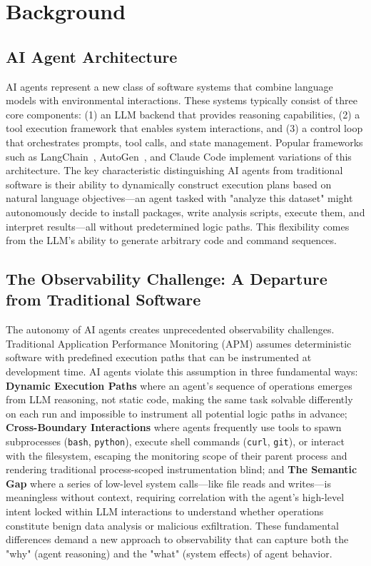\section{Background}

\subsection{AI Agent Architecture}

AI agents represent a new class of software systems that combine language models with environmental interactions. These systems typically consist of three core components: (1) an LLM backend that provides reasoning capabilities, (2) a tool execution framework that enables system interactions, and (3) a control loop that orchestrates prompts, tool calls, and state management. Popular frameworks such as LangChain~\cite{langchain}, AutoGen~\cite{autogen}, and Claude Code implement variations of this architecture. The key characteristic distinguishing AI agents from traditional software is their ability to dynamically construct execution plans based on natural language objectives—an agent tasked with "analyze this dataset" might autonomously decide to install packages, write analysis scripts, execute them, and interpret results—all without predetermined logic paths. This flexibility comes from the LLM's ability to generate arbitrary code and command sequences.

\subsection{The Observability Challenge: A Departure from Traditional Software}

The autonomy of AI agents creates unprecedented observability challenges. Traditional Application Performance Monitoring (APM) assumes deterministic software with predefined execution paths that can be instrumented at development time. AI agents violate this assumption in three fundamental ways: \textbf{Dynamic Execution Paths} where an agent's sequence of operations emerges from LLM reasoning, not static code, making the same task solvable differently on each run and impossible to instrument all potential logic paths in advance; \textbf{Cross-Boundary Interactions} where agents frequently use tools to spawn subprocesses (\texttt{bash}, \texttt{python}), execute shell commands (\texttt{curl}, \texttt{git}), or interact with the filesystem, escaping the monitoring scope of their parent process and rendering traditional process-scoped instrumentation blind; and \textbf{The Semantic Gap} where a series of low-level system calls—like file reads and writes—is meaningless without context, requiring correlation with the agent's high-level intent locked within LLM interactions to understand whether operations constitute benign data analysis or malicious exfiltration. These fundamental differences demand a new approach to observability that can capture both the "why" (agent reasoning) and the "what" (system effects) of agent behavior.

